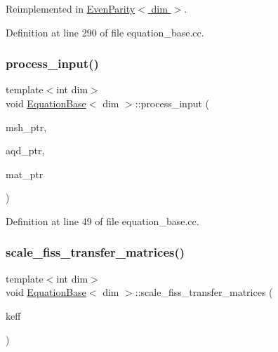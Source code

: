 Reimplemented in \hyperlink{class_even_parity_a4cc64002161193e2227e962c9ecb8cf5}{Even\+Parity$<$ dim $>$}.



Definition at line 290 of file equation\+\_\+base.\+cc.

\mbox{\label{class_equation_base_afd853e7e9fd859216a705a517235c6ba}} 
\subsubsection{\texorpdfstring{process\+\_\+input()}{process\_input()}}
{\footnotesize\ttfamily template$<$int dim$>$ \\
void \hyperlink{class_equation_base}{Equation\+Base}$<$ dim $>$\+::process\+\_\+input (\begin{DoxyParamCaption}\item[{const std\+\_\+cxx11\+::shared\+\_\+ptr$<$ \hyperlink{class_mesh_generator}{Mesh\+Generator}$<$ dim $>$ $>$}]{msh\+\_\+ptr,  }\item[{const std\+\_\+cxx11\+::shared\+\_\+ptr$<$ \hyperlink{class_a_q_base}{A\+Q\+Base}$<$ dim $>$ $>$}]{aqd\+\_\+ptr,  }\item[{const std\+\_\+cxx11\+::shared\+\_\+ptr$<$ \hyperlink{class_material_properties}{Material\+Properties} $>$}]{mat\+\_\+ptr }\end{DoxyParamCaption})\hspace{0.3cm}{\ttfamily [private]}}



Definition at line 49 of file equation\+\_\+base.\+cc.

\mbox{\label{class_equation_base_a13947db6be48085b9dca97117c73b5ca}} 
\subsubsection{\texorpdfstring{scale\+\_\+fiss\+\_\+transfer\+\_\+matrices()}{scale\_fiss\_transfer\_matrices()}}
{\footnotesize\ttfamily template$<$int dim$>$ \\
void \hyperlink{class_equation_base}{Equation\+Base}$<$ dim $>$\+::scale\+\_\+fiss\+\_\+transfer\+\_\+matrices (\begin{DoxyParamCaption}\item[{double}]{keff }\end{DoxyParamCaption})}



